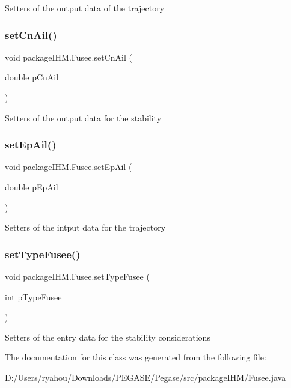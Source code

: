 Setters of the output data of the trajectory \mbox{\label{classpackage_i_h_m_1_1_fusee_a4932fbd05f898de11de1ada5313f37cb}} 
\subsubsection{\texorpdfstring{set\+Cn\+Ail()}{setCnAil()}}
{\footnotesize\ttfamily void package\+I\+H\+M.\+Fusee.\+set\+Cn\+Ail (\begin{DoxyParamCaption}\item[{double}]{p\+Cn\+Ail }\end{DoxyParamCaption})}

Setters of the output data for the stability \mbox{\label{classpackage_i_h_m_1_1_fusee_a9f238ddf7075ac84479926b56ff34a93}} 
\subsubsection{\texorpdfstring{set\+Ep\+Ail()}{setEpAil()}}
{\footnotesize\ttfamily void package\+I\+H\+M.\+Fusee.\+set\+Ep\+Ail (\begin{DoxyParamCaption}\item[{double}]{p\+Ep\+Ail }\end{DoxyParamCaption})}

Setters of the intput data for the trajectory \mbox{\label{classpackage_i_h_m_1_1_fusee_a565696aea0d2c2d6de0c1e97df4a0595}} 
\subsubsection{\texorpdfstring{set\+Type\+Fusee()}{setTypeFusee()}}
{\footnotesize\ttfamily void package\+I\+H\+M.\+Fusee.\+set\+Type\+Fusee (\begin{DoxyParamCaption}\item[{int}]{p\+Type\+Fusee }\end{DoxyParamCaption})}

Setters of the entry data for the stability considerations 

The documentation for this class was generated from the following file\+:\begin{DoxyCompactItemize}
\item 
D\+:/\+Users/ryahou/\+Downloads/\+P\+E\+G\+A\+S\+E/\+Pegase/src/package\+I\+H\+M/Fusee.\+java\end{DoxyCompactItemize}
